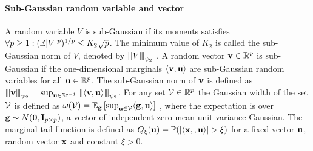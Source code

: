 \paragraph{Sub-Gaussian random variable and vector}
A random variable $V$ is sub-Gaussian if its moments satisfies $\forall p \geq 1: (\mathbb{E} |V|^p )^{1/p} \leq K_2 \sqrt{p}$.
The minimum value of $K_2$ is called the sub-Gaussian  norm of $V$, denoted by ${\left\vert\kern-0.25ex\left\vert\kern-0.25ex\left\vert V \right\vert\kern-0.25ex\right\vert\kern-0.25ex\right\vert}_{\psi_2}$ \cite{vers12}.
A random vector $\mathbf{v} \in \mathbb R^p$ is sub-Gaussian if the one-dimensional marginals $\langle \mathbf{v}, \mathbf{u} \rangle$ are sub-Gaussian random variables for all $\mathbf{u} \in \mathbb R^p$. The sub-Gaussian norm of $\mathbf{v}$ is defined \cite{vers12} as ${\left\vert\kern-0.25ex\left\vert\kern-0.25ex\left\vert \mathbf{v} \right\vert\kern-0.25ex\right\vert\kern-0.25ex\right\vert}_{\psi_2} = \sup_{\mathbf{u} \in \mathbb S^{p-1}} {\left\vert\kern-0.25ex\left\vert\kern-0.25ex\left\vert \langle \mathbf{v}, \mathbf{u} \rangle \right\vert\kern-0.25ex\right\vert\kern-0.25ex\right\vert}_{\psi_2}$.
For any set $\cV \in \reals^p$ the Gaussian width of the set $\cV$ is defined as $\omega(\cV) = \ex_\g \left[ \sup_{\u \in \cV} \langle \g, \u \rangle \right]$ \cite{vershynin2018high}, where the expectation is over $\mathbf{g} \sim N(\mathbf{0}, \mathbf{I}_{p \times p})$, a vector of independent zero-mean unit-variance Gaussian. The marginal tail function is defined as $Q_{\xi}(\mathbf{u}) = \mathbb{P}(|\langle \mathbf{x}, , \mathbf{u} \rangle| > \xi)$ for a fixed vector $\mathbf{u}$, random vector $\mathbf{x}$ and constant $\xi > 0$. 



